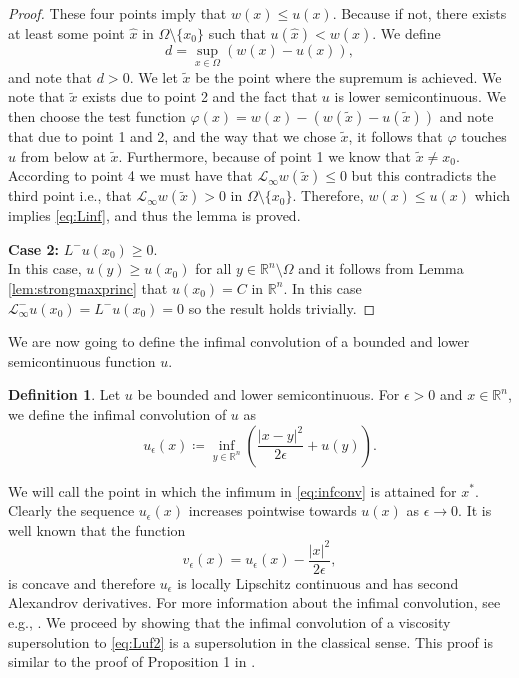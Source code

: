 \documentclass[11pt]{article}
\providecommand{\Linf}{\mathcal{L}_{\infty}}
\providecommand{\Lneg}{\mathcal{L}_{\infty}^-}
\providecommand{\Rn}{\mathbb{R}^n}
\numberwithin{equation}{section}
\theoremstyle{definition}
\newtheorem{definition}{Definition}[section]
\begin{document}
\begin{proof}
These four points imply that $w(x) \leq u(x)$. Because if not, there exists at least some point $\hat{x}$ in $\Omega \setminus \{x_0\}$ such that $u(\hat{x}) < w(\hat{x})$. We define
$$
d = \sup_{x \in \Omega} \left(w(x)-u(x)\right),
$$
and note that $d >0$. We let $\tilde{x}$ be the point where the supremum is achieved. We note that $\tilde{x}$ exists due to point 2 and the fact that $u$ is lower semicontinuous. We then choose the test function $\varphi(x) = w(x)- (w(\tilde{x})-u(\tilde{x}))$ and note that due to point 1 and 2, and the way that we chose $\tilde{x}$, it follows that $\varphi$ touches $u$ from below at $\tilde{x}$. Furthermore, because of point 1 we know that $\tilde{x} \neq x_0$. According to point 4 we must have that $\Linf w(\tilde{x}) \leq 0$ but this contradicts the third point i.e., that $\Linf w(\tilde{x}) > 0$ in $\Omega \setminus \{x_0\}$. Therefore, $w(x) \leq u(x)$ which implies \eqref{eq:Linf}, and thus the lemma is proved.

\textbf{Case 2:} $L^- u(x_0) \geq 0$. \\
In this case, $u(y) \geq u(x_0)$ for all $y \in \Rn \setminus \Omega$ and it follows from Lemma \ref{lem:strongmaxprinc} that $u(x_0)=C$ in $\Rn$. In this case $\Lneg u(x_0) = L^-u(x_0)=0$ so the result holds trivially. 
\end{proof}

We are now going to define the infimal convolution of a bounded and lower semicontinuous function $u$. 

\begin{definition}
\label{def:infconv}
    Let $u$ be bounded and lower semicontinuous. For $\epsilon > 0$ and $x \in \Rn$, we define the infimal convolution of $u$ as 
\begin{equation}\label{eq:infconv}
      u_{\epsilon}(x) \coloneqq \inf_{y \in \Rn} \left(\frac{|x-y|^2}{2 \epsilon} + u(y)\right) .    
\end{equation}
\end{definition}
We will call the point in which the infimum in \eqref{eq:infconv} is attained for $x^*$. Clearly the sequence $u_{\epsilon}(x)$ increases pointwise towards $u(x)$ as $\epsilon \to 0$. It is well known that the function
$$
v_{\epsilon}(x) = u_{\epsilon}(x)-\frac{|x|^2}{2 \epsilon},
$$
is concave and therefore $u_{\epsilon}$ is locally Lipschitz continuous and has second Alexandrov derivatives. For more information about the infimal convolution, see e.g., \cite{JP2012}. We proceed by showing that the infimal convolution of a viscosity supersolution to \eqref{eq:Luf2} is a supersolution in the classical sense. This proof is similar to the proof of Proposition 1 in \cite{LM2006}.
\end{document}
